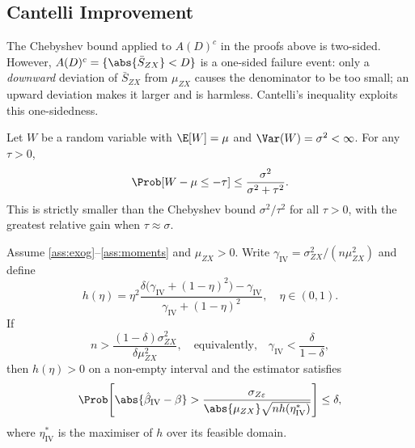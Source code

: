 \subsection{Cantelli Improvement}
\label{sec:iv_cantelli}

The Chebyshev bound applied to $A(D)^c$ in the proofs above is two-sided. However, $A(D)^c = \{\abs{\bar{S}_{ZX}} < D\}$ is a one-sided failure event: only a \emph{downward} deviation of $\bar{S}_{ZX}$ from $\mu_{ZX}$ causes the denominator to be too small; an upward deviation makes it larger and is harmless. Cantelli's inequality exploits this one-sidedness.

\begin{lemma}
    \label{lem:cantelli}
    Let $W$ be a random variable with $\E[W]=\mu$ and $\Var(W)=\sigma^2<\infty$.
    For any $\tau>0$,
    \[
        \Prob[W - \mu \leq -\tau] \leq \frac{\sigma^2}{\sigma^2 + \tau^2}.
    \]
    This is strictly smaller than the Chebyshev bound $\sigma^2/\tau^2$ for all $\tau>0$, with the greatest relative gain when $\tau\approx\sigma$.
\end{lemma}

\begin{theorem}
\label{thm:iv_cantelli}
    Assume \ref{ass:exog}--\ref{ass:moments} and $\mu_{ZX}>0$. Write $\gamma_{\mathrm{IV}} = \sigma_{ZX}^2/(n\mu_{ZX}^2)$ and define
    \begin{equation}
    \label{eq:h_eta_iv}
        h(\eta) = \eta^2
        \frac{\delta\bigl(\gamma_{\mathrm{IV}}+(1-\eta)^2\bigr)-\gamma_{\mathrm{IV}}}
            {\gamma_{\mathrm{IV}}+(1-\eta)^2},
        \quad \eta\in(0,1).
    \end{equation}
    If
    \begin{equation}
    \label{eq:iv_cantelli_strength}
        n > \frac{(1-\delta)\sigma_{ZX}^2}{\delta\mu_{ZX}^2}, \quad\text{equivalently,}\quad \gamma_{\mathrm{IV}} < \frac{\delta}{1-\delta},
    \end{equation}
    then $h(\eta)>0$ on a non-empty interval and the estimator satisfies
    \begin{equation}
    \label{eq:iv_cantelli_bound}
        \Prob\!\left[\abs{\hat{\beta}_{\mathrm{IV}} - \beta}
            > \frac{\sigma_{Z\varepsilon}}{\abs{\mu_{ZX}}\sqrt{nh(\eta^*_{\mathrm{IV}})}}
            \right] \leq \delta,
    \end{equation}
    where $\eta^*_{\mathrm{IV}}$ is the maximiser of $h$ over its feasible domain.
\end{theorem}

